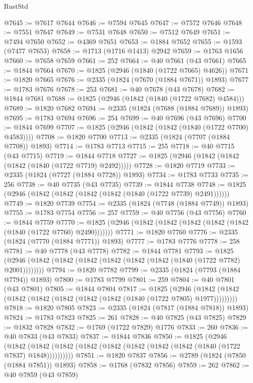 \begin{lexlean}{RustStd}
\begin{coremodule}
@7645 := @7617 @7644
@7646 := @7594 @7645
@7647 := @7572 @7646
@7648 := @7551 @7647
@7649 := @7531 @7648
@7650 := @7512 @7649
@7651 := @7494 @7650
@7652 := @4369 @7651
@7653 := @1884 @7652
@7655 := @1593 (@7477 @7653)
@7658 := @1713 (@1716 @1413) @2942
@7659 := @1763 @1656
@7660 := @7658 @7659
@7661 := 252
@7664 := @40 @7661 (@43 @7661)
@7665 := @1844 @7664
@7670 := @1825 (@2946 (@1840 (@1722 @7665) @4626))
@7671 := @1820 @7665
@7676 := @2335 (@1824 (@7670 (@1884 @7671)) @1893)
@7677 := @1783 @7676
@7678 := 253
@7681 := @40 @7678 (@43 @7678)
@7682 := @1844 @7681
@7688 := @1825 (@2946 (@1842 (@1840 (@1722 @7682) @4584)))
@7689 := @1820 @7682
@7694 := @2335 (@1824 (@7688 (@1884 @7689)) @1893)
@7695 := @1783 @7694
@7696 := 254
@7699 := @40 @7696 (@43 @7696)
@7700 := @1844 @7699
@7707 := @1825 (@2946 (@1842 (@1842 (@1840 (@1722 @7700) @4583))))
@7708 := @1820 @7700
@7713 := @2335 (@1824 (@7707 (@1884 @7708)) @1893)
@7714 := @1783 @7713
@7715 := 255
@7718 := @40 @7715 (@43 @7715)
@7719 := @1844 @7718
@7727 := @1825 (@2946 (@1842 (@1842 (@1842 (@1840 (@1722 @7719) @2492)))))
@7728 := @1820 @7719
@7733 := @2335 (@1824 (@7727 (@1884 @7728)) @1893)
@7734 := @1783 @7733
@7735 := 256
@7738 := @40 @7735 (@43 @7735)
@7739 := @1844 @7738
@7748 := @1825 (@2946 (@1842 (@1842 (@1842 (@1842 (@1840 (@1722 @7739) @2491))))))
@7749 := @1820 @7739
@7754 := @2335 (@1824 (@7748 (@1884 @7749)) @1893)
@7755 := @1783 @7754
@7756 := 257
@7759 := @40 @7756 (@43 @7756)
@7760 := @1844 @7759
@7770 := @1825 (@2946 (@1842 (@1842 (@1842 (@1842 (@1842 (@1840 (@1722 @7760) @2490)))))))
@7771 := @1820 @7760
@7776 := @2335 (@1824 (@7770 (@1884 @7771)) @1893)
@7777 := @1783 @7776
@7778 := 258
@7781 := @40 @7778 (@43 @7778)
@7782 := @1844 @7781
@7793 := @1825 (@2946 (@1842 (@1842 (@1842 (@1842 (@1842 (@1842 (@1840 (@1722 @7782) @2001))))))))
@7794 := @1820 @7782
@7799 := @2335 (@1824 (@7793 (@1884 @7794)) @1893)
@7800 := @1783 @7799
@7801 := 259
@7804 := @40 @7801 (@43 @7801)
@7805 := @1844 @7804
@7817 := @1825
    (@2946 (@1842 (@1842 (@1842 (@1842 (@1842 (@1842 (@1842 (@1840 (@1722 @7805) @1977)))))))))
@7818 := @1820 @7805
@7823 := @2335 (@1824 (@7817 (@1884 @7818)) @1893)
@7824 := @1783 @7823
@7825 := 261
@7828 := @40 @7825 (@43 @7825)
@7829 := @1832 @7828
@7832 := @1769 (@1722 @7829) @1776
@7833 := 260
@7836 := @40 @7833 (@43 @7833)
@7837 := @1844 @7836
@7850 := @1825
    (@2946
      (@1842 (@1842 (@1842 (@1842 (@1842 (@1842 (@1842 (@1842 (@1840 (@1722 @7837) @1848))))))))))
@7851 := @1820 @7837
@7856 := @2789 (@1824 (@7850 (@1884 @7851)) @1893)
@7858 := @1768 (@7832 @7856)
@7859 := 262
@7862 := @40 @7859 (@43 @7859)

\end{coremodule}
\end{lexlean}
